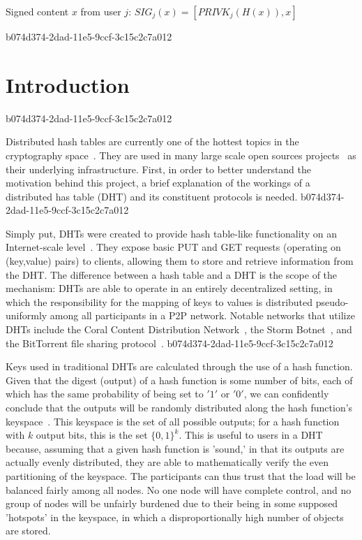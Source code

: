 \documentclass[12pt]{article}
\begin{document}
Signed content $x$ from user $j$: $SIG_j(x) = \left[ PRIVK_j( H(x) ), x \right]$

b074d374-2dad-11e5-9ccf-3c15c2c7a012\section{Introduction}
b074d374-2dad-11e5-9ccf-3c15c2c7a012\par Distributed hash tables are currently one of the hottest topics in the cryptography space~\cite{Stoica:2001dj,Rowstron:2001ea,Ratnasamy:2001wn}. They are used in many large scale open sources projects~\cite{Freitas:2013tb,Xu:2010vs,Perfitt:2010fh} as their underlying infrastructure. First, in order to better understand the motivation behind this project, a brief explanation of the workings of a distributed has table (DHT) and its constituent protocols is needed.
b074d374-2dad-11e5-9ccf-3c15c2c7a012
\par Simply put, DHTs were created to provide hash table-like functionality on an Internet-scale level~\cite{Ratnasamy:2001wn}. They expose basic PUT and GET requests (operating on (key,value) pairs) to clients, allowing them to store and retrieve information from the DHT. The difference between a hash table and a DHT is the scope of the mechanism: DHTs are able to operate in an entirely decentralized setting, in which the responsibility for the mapping of keys to values is distributed pseudo-uniformly among all participants in a P2P network. Notable networks that utilize DHTs include the Coral Content Distribution Network~\cite{Freedman:2004vb}, the Storm Botnet~\cite{Holz:2008uk}, and the BitTorrent file sharing protocol~\cite{Cohen:y1_8mBnw}.
b074d374-2dad-11e5-9ccf-3c15c2c7a012
\par Keys used in traditional DHTs are calculated through the use of a hash function. Given that the digest (output) of a hash function is some number of bits, each of which has the same probability of being set to $'1'$ or $'0'$, we can confidently conclude that the outputs will be randomly distributed along the hash function's keyspace~. This keyspace is the set of all possible outputs; for a hash function with $k$ output bits, this is the set $\{0,1\}^k$. This is useful to users in a DHT because, assuming that a given hash function is 'sound,' in that its outputs are actually evenly distributed, they are able to mathematically verify the even partitioning of the keyspace. The participants can thus trust that the load will be balanced fairly among all nodes. No one node will have complete control, and no group of nodes will be unfairly burdened due to their being in some supposed 'hotspots' in the keyspace, in which a disproportionally high number of objects are stored.~
\end{document}
